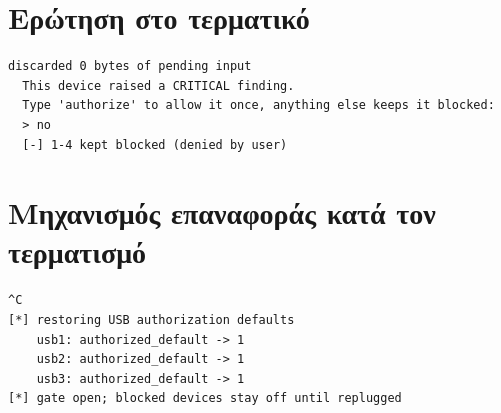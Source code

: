 \section{Ερώτηση στο τερματικό}

\begin{lstlisting}[caption={Ερώτηση για συσκευή με κρίσιμο εύρημα (σχηματικά).},label=lst:prompt]
  discarded 0 bytes of pending input
  This device raised a CRITICAL finding.
  Type 'authorize' to allow it once, anything else keeps it blocked:
  > no
  [-] 1-4 kept blocked (denied by user)
\end{lstlisting}

\section{Μηχανισμός επαναφοράς κατά τον τερματισμό}

\begin{lstlisting}[caption={Έξοδος κατά τον τερματισμό με \en{Ctrl-C} (σχηματικά).},label=lst:shutdown]
^C
[*] restoring USB authorization defaults
    usb1: authorized_default -> 1
    usb2: authorized_default -> 1
    usb3: authorized_default -> 1
[*] gate open; blocked devices stay off until replugged
\end{lstlisting}
